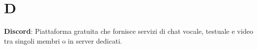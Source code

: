 \section{D}
\textbf{Discord}: Piattaforma gratuita che fornisce servizi di chat vocale, testuale e video tra singoli membri o in server dedicati.\\